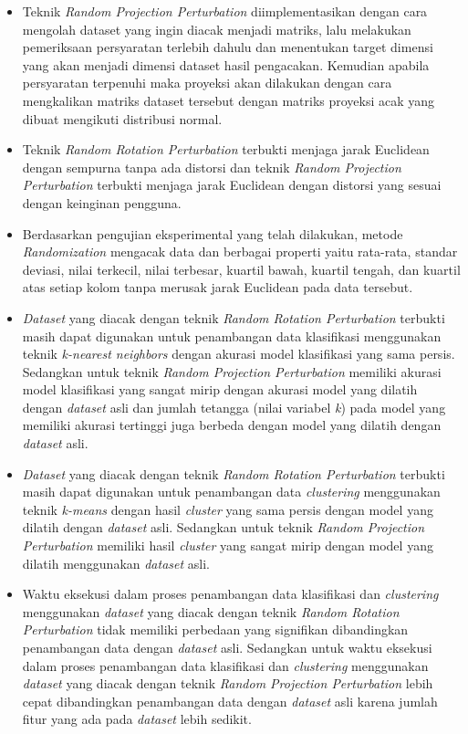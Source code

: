 \begin{itemize}
    \item Teknik \textit{Random Projection Perturbation} diimplementasikan dengan cara mengolah dataset yang ingin diacak menjadi matriks, lalu melakukan pemeriksaan persyaratan terlebih dahulu dan menentukan target dimensi yang akan menjadi dimensi dataset hasil pengacakan. Kemudian apabila persyaratan terpenuhi maka proyeksi akan dilakukan dengan cara mengkalikan matriks dataset tersebut dengan matriks proyeksi acak yang dibuat mengikuti distribusi normal.
    \item Teknik \textit{Random Rotation Perturbation} terbukti menjaga jarak Euclidean dengan sempurna tanpa ada distorsi dan teknik \textit{Random Projection Perturbation} terbukti menjaga jarak Euclidean dengan distorsi yang sesuai dengan keinginan pengguna.
    \item Berdasarkan pengujian eksperimental yang telah dilakukan, metode \textit{Randomization} mengacak data dan berbagai properti yaitu rata-rata, standar deviasi, nilai terkecil, nilai terbesar, kuartil bawah, kuartil tengah, dan kuartil atas setiap kolom tanpa merusak jarak Euclidean pada data tersebut.
    \item \textit{Dataset} yang diacak dengan teknik \textit{Random Rotation Perturbation} terbukti masih dapat digunakan untuk penambangan data klasifikasi menggunakan teknik \textit{k-nearest neighbors} dengan akurasi model klasifikasi yang sama persis. Sedangkan untuk teknik \textit{Random Projection Perturbation} memiliki akurasi model klasifikasi yang sangat mirip dengan akurasi model yang dilatih dengan \textit{dataset} asli dan jumlah tetangga (nilai variabel \textit{k}) pada model yang memiliki akurasi tertinggi juga berbeda dengan model yang dilatih dengan \textit{dataset} asli.
    \item \textit{Dataset} yang diacak dengan teknik \textit{Random Rotation Perturbation} terbukti masih dapat digunakan untuk penambangan data \textit{clustering} menggunakan teknik \textit{k-means} dengan hasil \textit{cluster} yang sama persis dengan model yang dilatih dengan \textit{dataset} asli. Sedangkan untuk teknik \textit{Random Projection Perturbation} memiliki hasil \textit{cluster} yang sangat mirip dengan model yang dilatih menggunakan \textit{dataset} asli.
    \item Waktu eksekusi dalam proses penambangan data klasifikasi dan \textit{clustering} menggunakan \textit{dataset} yang diacak dengan teknik \textit{Random Rotation Perturbation} tidak memiliki perbedaan yang signifikan dibandingkan penambangan data dengan \textit{dataset} asli. Sedangkan untuk waktu eksekusi dalam proses penambangan data klasifikasi dan \textit{clustering} menggunakan \textit{dataset} yang diacak dengan teknik \textit{Random Projection Perturbation} lebih cepat dibandingkan penambangan data dengan \textit{dataset} asli karena jumlah fitur yang ada pada \textit{dataset} lebih sedikit.
\end{itemize}

